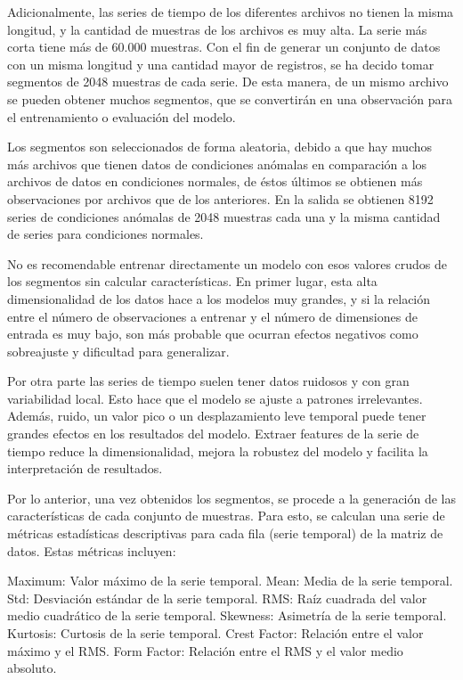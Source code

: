 \documentclass[11pt,a4paper,spanish]{book}
\numberwithin{equation}{chapter}
\numberwithin{figure}{chapter}
\begin{document}
Adicionalmente, las series de tiempo de los diferentes archivos no tienen la misma longitud, y la cantidad de muestras de los archivos es muy alta. La serie más corta tiene más de 60.000 muestras. Con el fin de generar un conjunto de datos con un misma longitud y una cantidad mayor de registros, se ha decido tomar segmentos de 2048 muestras de cada serie.  De esta manera, de un mismo archivo se pueden obtener muchos segmentos, que se convertirán en una observación para el entrenamiento o evaluación del modelo. 


Los segmentos son seleccionados de forma aleatoria, debido a que hay muchos más archivos que tienen datos de condiciones anómalas en comparación a los archivos de datos en condiciones normales, de éstos últimos se obtienen más observaciones por archivos que de los anteriores. En la salida se obtienen 8192 series de condiciones anómalas de 2048 muestras cada una y la misma cantidad de series para condiciones normales. 


No es recomendable entrenar directamente un modelo con esos valores crudos de los segmentos sin calcular características. En primer lugar, esta alta dimensionalidad de los datos hace a los modelos muy grandes, y si la relación entre el número de observaciones a entrenar y el número de dimensiones de entrada es muy bajo, son más probable que ocurran  efectos negativos como sobreajuste y dificultad para generalizar. 


Por otra parte las series de tiempo suelen tener datos ruidosos y con gran variabilidad local. Esto hace que el modelo se ajuste a patrones irrelevantes.  Además, ruido, un valor pico o un desplazamiento leve temporal puede tener grandes efectos en los resultados del modelo. Extraer features de la serie de tiempo reduce la dimensionalidad, mejora la robustez del modelo y facilita la interpretación de resultados. 


Por lo anterior, una vez obtenidos los segmentos, se procede a la generación de las características de cada conjunto de muestras. Para esto, se calculan una serie de métricas estadísticas descriptivas para cada fila (serie temporal) de la matriz de datos. Estas métricas incluyen:


Maximum: Valor máximo de la serie temporal.
Mean: Media de la serie temporal.
Std: Desviación estándar de la serie temporal.
RMS: Raíz cuadrada del valor medio cuadrático de la serie temporal.
Skewness: Asimetría de la serie temporal.
Kurtosis: Curtosis de la serie temporal.
Crest Factor: Relación entre el valor máximo y el RMS.
Form Factor: Relación entre el RMS y el valor medio absoluto.
\end{document}
